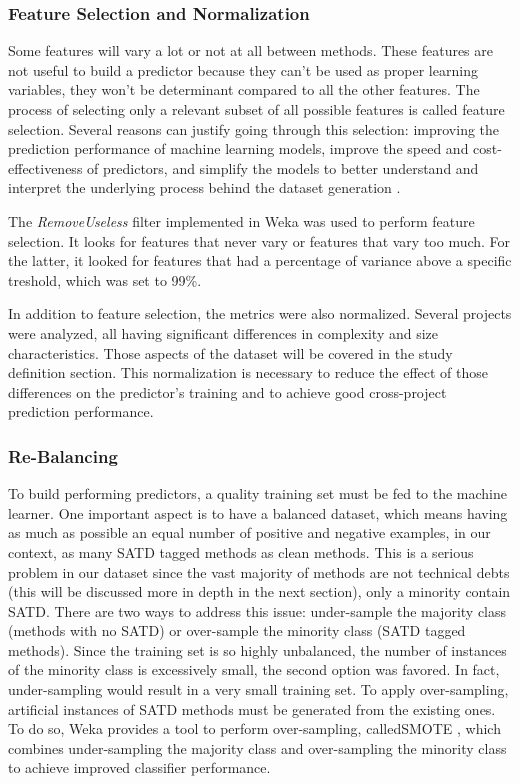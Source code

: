 \subsubsection{Feature Selection and Normalization}

Some features will vary a lot or not at all between methods. These features are not useful to build a predictor because they can't be used as proper learning variables, they won't be determinant compared to all the other features. The process of selecting only a relevant subset of all possible features is called feature selection. Several reasons can justify going through this selection: improving the prediction performance of machine learning models, improve the speed and cost-effectiveness of predictors, and simplify the models to better understand and interpret the underlying process behind the dataset generation \citep{guyon2003introduction}. \par 

The \emph{RemoveUseless} filter implemented in Weka \citep{hall2009weka} was used to perform feature selection. It looks for features that never vary or features that vary too much. For the latter, it looked for features that had a percentage of variance above a specific treshold, which was set to 99\%. \par 

In addition to feature selection, the metrics were also normalized. Several projects were analyzed, all having significant differences in complexity and size characteristics. Those aspects of the dataset will be covered in the study definition section. This normalization is necessary to reduce the effect of those differences on the predictor's training and to achieve good cross-project prediction performance.

\subsubsection{Re-Balancing}

To build performing predictors, a quality training set must be fed to the machine learner. One important aspect is to have a balanced dataset, which means having as much as possible an equal number of positive and negative examples, in our context, as many \ac{SATD} tagged methods as clean methods. This is a serious problem in our dataset since the vast majority of methods are not technical debts (this will be discussed more in depth in the next section), only a minority contain \ac{SATD}. There are two ways to address this issue: under-sample the majority class (methods with no \ac{SATD}) or over-sample the minority class (\ac{SATD} tagged methods). Since the training set is so highly unbalanced, the number of instances of the minority class is excessively small, the second option was favored. In fact, under-sampling would result in a very small training set. To apply over-sampling, artificial instances of \ac{SATD} methods must be generated from the existing ones. To do so, Weka provides a tool to perform over-sampling, called\ac{SMOTE} \citep{chawla2002smote}, which combines under-sampling the majority class and over-sampling the minority class to achieve improved classifier performance.

